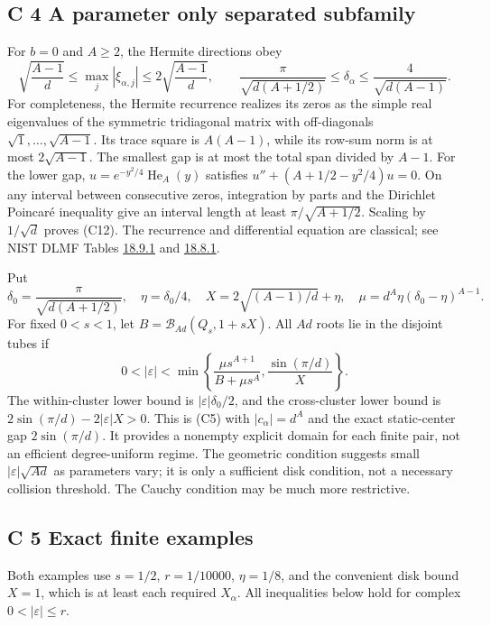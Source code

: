 \documentclass[
  11pt,
]{article}
\begin{document}
\subsection{C 4 A parameter only separated subfamily}

For \(b=0\) and \(A\geq2\), the Hermite directions obey
\[
\sqrt{\frac{A-1}{d}}\leq\max_j|\xi_{\alpha,j}|
\leq2\sqrt{\frac{A-1}{d}},\qquad
\frac{\pi}{\sqrt{d(A+1/2)}}\leq\delta_\alpha
\leq\frac4{\sqrt{d(A-1)}}. \tag{C12}
\]
For completeness, the Hermite recurrence realizes its zeros as the
simple real eigenvalues of the symmetric tridiagonal matrix with
off-diagonals \(\sqrt1,\ldots,\sqrt{A-1}\). Its trace square is
\(A(A-1)\), while its row-sum norm is at most \(2\sqrt{A-1}\).
The smallest gap is at most the total span divided by \(A-1\).
For the lower gap, \(u=e^{-y^2/4}\operatorname{He}_A(y)\) satisfies
\(u''+(A+1/2-y^2/4)u=0\). On any interval between consecutive zeros,
integration by parts and the Dirichlet Poincar\'e inequality give an
interval length at least \(\pi/\sqrt{A+1/2}\). Scaling by
\(1/\sqrt d\) proves (C12). The recurrence and differential equation
are classical; see NIST DLMF Tables
\href{https://dlmf.nist.gov/18.9.T1}{18.9.1} and
\href{https://dlmf.nist.gov/18.8.T1}{18.8.1}.

Put
\[
\delta_0=\frac\pi{\sqrt{d(A+1/2)}},\quad
\eta=\delta_0/4,\quad X=2\sqrt{(A-1)/d}+\eta,\quad
\mu=d^A\eta(\delta_0-\eta)^{A-1}.
\]
For fixed \(0<s<1\), let \(B=\mathcal B_{Ad}(Q_s,1+sX)\).
All \(Ad\) roots lie in the disjoint tubes if
\[
0<|\varepsilon|<
\min\left\{\frac{\mu s^{A+1}}{B+\mu s^A},
\frac{\sin(\pi/d)}X\right\}. \tag{C13}
\]
The within-cluster lower bound is
\(|\varepsilon|\delta_0/2\), and the cross-cluster lower bound is
\(2\sin(\pi/d)-2|\varepsilon|X>0\). This is (C5) with
\(|c_\alpha|=d^A\) and the exact static-center gap
\(2\sin(\pi/d)\). It provides a nonempty explicit domain for each
finite pair, not an efficient degree-uniform regime. The geometric
condition suggests small \(|\varepsilon|\sqrt{Ad}\) as parameters
vary; it is only a sufficient disk condition, not a necessary collision
threshold. The Cauchy condition may be much more restrictive.

\subsection{C 5 Exact finite examples}

Both examples use \(s=1/2\), \(r=1/10000\), \(\eta=1/8\), and
the convenient disk bound \(X=1\), which is at least each required
\(X_\alpha\). All inequalities below hold for complex
\(0<|\varepsilon|\leq r\).
\end{document}
